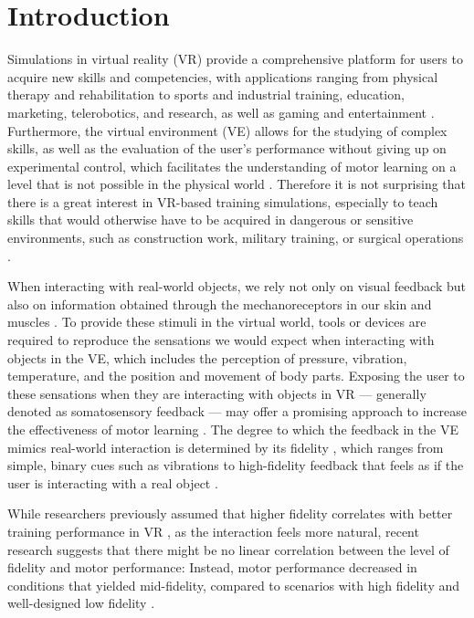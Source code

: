 
\section{Introduction}
Simulations in virtual reality (VR) provide a comprehensive platform for users to acquire new skills and competencies, with applications ranging from physical therapy and rehabilitation to sports and industrial training, education, marketing, telerobotics, and research, as well as gaming and entertainment \cite{Wu2023TrainingReality, Oagaz2022PerformanceReality}. Furthermore, the virtual environment (VE) allows for the studying of complex skills, as well as the evaluation of the user's performance without giving up on experimental control, which facilitates the understanding of motor learning on a level that is not possible in the physical world \cite{Harris2021ExploringSimulator, Levac2019LearningReview}. Therefore it is not surprising that there is a great interest in VR-based training simulations, especially to teach skills that would otherwise have to be acquired in dangerous or sensitive environments, such as construction work, military training, or surgical operations \cite{Adami2021EffectivenessTeleoperation, Lele2013VirtualUtility, Qi2021VirtualScenario}.

When interacting with real-world objects, we rely not only on visual feedback but also on information obtained through the mechanoreceptors in our skin and muscles \cite{Gonzalez-Grandon2021ProprioceptionInteraction}. To provide these stimuli in the virtual world, tools or devices are required to reproduce the sensations we would expect when interacting with objects in the VE, which includes the perception of pressure, vibration, temperature, and the position and movement of body parts. Exposing the user to these sensations when they are interacting with objects in VR --- generally denoted as somatosensory feedback --- may offer a promising approach to increase the effectiveness of motor learning \cite{Sainburg2022MovementNeurorehabilitation, Sigrist2013AugmentedReview}. 
The degree to which the feedback in the VE mimics real-world interaction is determined by its fidelity \cite{Caird1996PersistentTraining}, which ranges from simple, binary cues such as vibrations to high-fidelity feedback that feels as if the user is interacting with a real object \cite{Yang2023}.

While researchers previously assumed that higher fidelity correlates with better training performance in VR \cite{Caird1996PersistentTraining, Waller1998TheTraining}, as the interaction feels more natural, recent research suggests that there might be no linear correlation between the level of fidelity and motor performance: Instead, motor performance decreased in conditions that yielded mid-fidelity, compared to scenarios with high fidelity and well-designed low fidelity \cite{MahdiNabiyouni201520153DUI.}.

